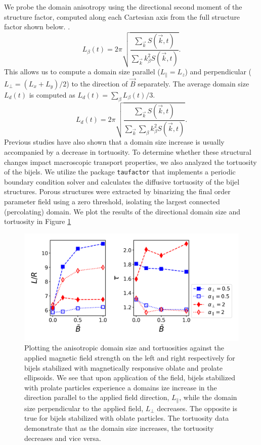 We probe the domain anisotropy using the directional second moment of the structure factor, computed along each Cartesian axis from the full structure factor shown
below. \cite{jansen_bijels_2011, gunther_timescales_2014}. 
    \begin{equation}
    L_\beta(t)=2\pi\sqrt{\frac{\sum_{\vec{k}}S(\vec{k},t)}{\sum_{\vec{k}}k_\beta^2 S(\vec{k},t)}} .
    \end{equation}
    This allows us to compute a domain size parallel
    (\(L_\parallel=L_z\)) and perpendicular (\(L_\perp=(L_x+L_y)/2\)) to the
    direction of \(\vec{B}\) separately. The average domain size \(L_d(t)\)
    is computed as \(L_d(t)=\sum_\beta L_\beta(t) / 3\).
    \begin{equation}
    L_d(t)=2\pi\sqrt{\frac{\sum_{\vec{k}}S(\vec{k},t)}{\sum_{\vec{k}}\sum_\beta k_\beta^2 S(\vec{k},t)}} .
    \end{equation}
Previous studies have also shown that a domain size increase is usually accompanied by a decrease in
tortuosity. \cite{karthikeyan_formation_2024} To determine whether these structural 
changes impact macroscopic transport properties, we also analyzed the tortuosity of the bijels. We utilize the package \texttt{taufactor} that implements
a periodic boundary condition solver and calculates the diffusive tortuosity of the bijel structures. Porous structures were 
extracted by binarizing the final order parameter field using a zero threshold, isolating the largest connected (percolating) domain. We plot the results of
the directional domain size and tortuosity in Figure \ref{fig:domain_size_aniso-field_on}

\begin{figure} 
    \centering 
    \includegraphics[scale=0.5]{../figures/results/paper2/domain_size_aniso-field_on.png} 
    \caption{Plotting the anisotropic domain size and tortuosities against the applied magnetic field strength on the left and right respectively for bijels 
             stabilized with magnetically responsive oblate and prolate ellipsoids. We see that upon application of the field, bijels stabilized with prolate 
             particles experience a domains ize increase in the direction parallel to the applied field direction, $L_{\parallel}$, while the domain size 
             perpendicular to the applied field, $L_{\perp}$ decreases. The opposite is true for bijels stabilized with oblate particles. The tortuosity data 
             demonstrate that as the domain size increases, the tortuosity decreases and vice versa.} 
    \label{fig:domain_size_aniso-field_on} 
\end{figure}

